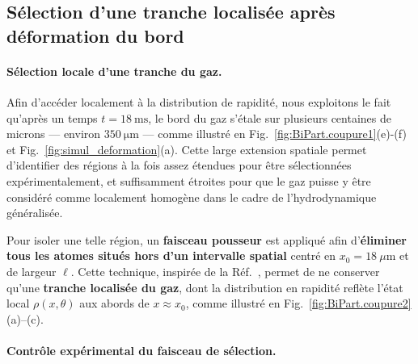 
\subsection{Sélection d’une tranche localisée après déformation du bord}

% 
%


\paragraph{Sélection locale d'une tranche du gaz.}

Afin d’accéder localement à la distribution de rapidité, nous exploitons le fait qu’après un temps $t = 18~\mathrm{ms}$, le bord du gaz s’étale sur plusieurs centaines de microns — environ $350~\mathrm{\mu m}$ — comme illustré en Fig.~\ref{fig:BiPart.coupure1}(e)-(f) et Fig.~\ref{fig:simul_deformation}(a). Cette large extension spatiale permet d’identifier des régions à la fois assez étendues pour être sélectionnées expérimentalement, et suffisamment étroites pour que le gaz puisse y être considéré comme localement homogène dans le cadre de l’hydrodynamique généralisée.

\medskip
\noindent
Pour isoler une telle région, un {\bf faisceau pousseur} est appliqué afin d’{\bf éliminer tous les atomes situés hors d’un intervalle spatial} centré en $x_0 = 18~\mu\mathrm{m}$ et de largeur $\ell$. Cette technique, inspirée de la Réf.~\cite{dubois_probing_2024}, permet de ne conserver qu’une {\bf tranche localisée du gaz}, dont la distribution en rapidité reflète l’état local $\rho(x,\theta)$ aux abords de $x \approx x_0$, comme illustré en Fig.~\ref{fig:BiPart.coupure2}(a)--(c).


\medskip
\paragraph{Contrôle expérimental du faisceau de sélection.}

